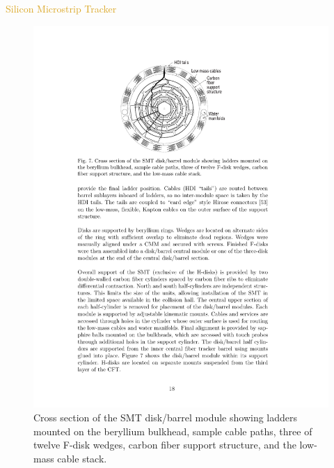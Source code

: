 \begin{frame}{\textcolor{Goldenrod}{Silicon Microstrip Tracker}}
\begin{overlayarea}{\textwidth}{\textheight}
\begin{figure}[h]
      \includegraphics[height=0.6\textheight]{./Images/09_SMT_04}
      \caption*{{\scriptsize Cross section of the SMT disk/barrel module showing
            ladders mounted on the beryllium bulkhead, sample cable paths,
            three of twelve F-disk wedges, carbon fiber support structure,
            and the low-mass cable stack.}}
      \end{figure}
\end{overlayarea}
\end{frame}


